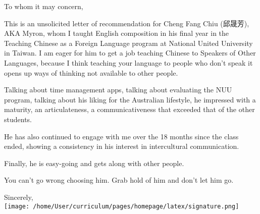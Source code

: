 \documentclass[11pt, a4paper]{letter} %
\begin{document}

\begin{letter}{
}


\opening{To whom it may concern,}

This is an unsolicited letter of recommendation for Cheng Fang 
Chiu (邱晟芳), AKA Myron, whom I taught English 
composition in his final year in the Teaching Chinese as 
a Foreign Language program at National United University 
in Taiwan. I am eager for him to get a job teaching 
Chinese to Speakers of Other Languages, because I think 
teaching your language to people who don't speak it opens 
up ways of thinking not available to other people.

Talking about time management apps, talking about evaluating the
NUU program, talking about his liking for the Australian lifestyle,
he impressed with a maturity, an articulateness, a communicativeness
that exceeded that of the other students.

He has also continued to engage with me over the 18 months since the class 
ended, showing a consistency in his interest in intercultural communication.

Finally, he is easy-going and gets along with other people.

You can't go wrong choosing him. Grab hold of him and don't let
him go.

\closing{Sincerely,\\
\texttt{[image: /home/User/curriculum/pages/homepage/latex/signature.png]} }



\end{letter}
\end{document}
